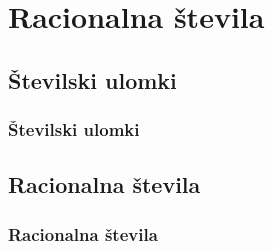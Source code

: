 \section{Racionalna števila}

\begin{frame}
    \sectionpage
\end{frame}

\begin{frame}
\end{frame}

    \subsection{Številski ulomki}

        \begin{frame}
            \frametitle{Številski ulomki}
        \end{frame}

    \subsection{Racionalna števila}

        \begin{frame}
            \frametitle{Racionalna števila}
        \end{frame}

